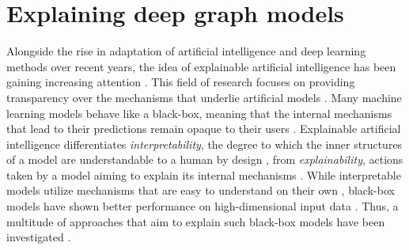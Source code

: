 \section{Explaining deep graph models}
\label{s_ExplainingGNNs}



Alongside the rise in adaptation of artificial intelligence and deep learning methods over recent years, the idea of explainable artificial intelligence has been gaining increasing attention \cite{adadi_peeking_2018}. This field of research focuses on providing transparency over the mechanisms that underlie artificial models \cite{barredo_arrieta_explainable_2020}. Many machine learning models behave like a black-box, meaning that the internal mechanisms that lead to their predictions remain opaque to their users \cite{prado-romero_survey_2023}. Explainable artificial intelligence differentiates \textit{interpretability}, the degree to which the inner structures of a model are understandable to a human by design \cite{barredo_arrieta_explainable_2020, li_explainability_2022}, from \textit{explainability}, actions taken by a model aiming to explain its internal mechanisms \cite{barredo_arrieta_explainable_2020}. While interpretable models utilize mechanisms that are easy to understand on their own \cite{prado-romero_survey_2023}, black-box models have shown better performance on high-dimensional input data \cite{prado-romero_survey_2023}. Thus, a multitude of approaches that aim to explain such black-box models have been investigated \cite{barredo_arrieta_explainable_2020, adadi_peeking_2018}.


